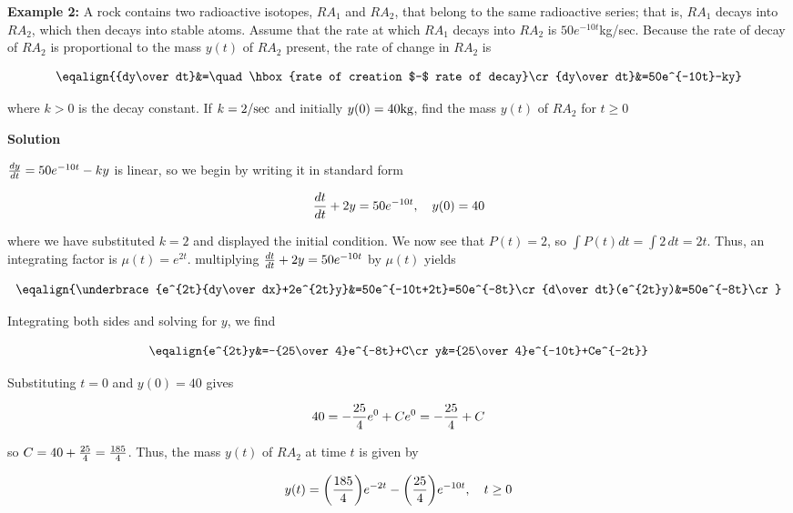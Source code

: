 \nopagenumbers
{\bf Example 2:} A rock contains two radioactive isotopes, $RA_1$ and $RA_2$, that belong to the same radioactive series; that is, $RA_1$ decays into $RA_2$, which then decays into stable atoms. Assume that the rate at which $RA_1$ decays into $RA_2$ is $50e^{-10t}$kg/sec. Because the rate of decay of $RA_2$ is proportional to the mass $y(t)$ of $RA_2$ present, the rate of change in $RA_2$ is

$$\eqalign{{dy\over dt}&=\quad\hbox{rate of creation $-$ rate of decay}\cr
	{dy\over dt}&=50e^{-10t}-ky}$$

where $k>0$ is the decay constant. If $k=2/\hbox{sec}$ and initially $y(0)=40\hbox{kg}$, find the mass $y(t)$ of $RA_2$ for $t\geq 0$

\vskip 10pt
{\bf Solution}

\vskip 6pt
${dy\over dt}=50e^{-10t}-ky$ is linear, so we begin by writing it in standard form

$${dt\over dt}+2y=50e^{-10t},\quad y(0)=40$$

where we have substituted $k=2$ and displayed the initial condition. We now see that $P(t)=2$, so $\int P(t)dt=\int 2\,dt=2t$. Thus, an integrating factor is $\mu(t)=e^{2t}$. multiplying ${dt\over dt} +2y=50e^{-10t}$ by $\mu(t)$ yields

$$\eqalign{\underbrace{e^{2t}{dy\over dx}+2e^{2t}y}&=50e^{-10t+2t}=50e^{-8t}\cr
	{d\over dt}(e^{2t}y)&=50e^{-8t}\cr}$$

Integrating both sides and solving for $y$, we find

$$\eqalign{e^{2t}y&=-{25\over 4}e^{-8t}+C\cr
	y&={25\over 4}e^{-10t}+Ce^{-2t}}$$

Substituting $t=0$ and $y(0)=40$ gives

$$40=-{25\over 4}e^0+Ce^0=-{25\over 4}+C$$

so $C=40+{25\over 4}={185\over 4}$. Thus, the mass $y(t)$ of $RA_2$ at time $t$ is given by

$$y(t)=\biggl({185\over 4}\biggr)e^{-2t}-\biggl({25\over 4}\biggr)e^{-10t},\quad t\geq 0$$

\vfill\eject
\bye
